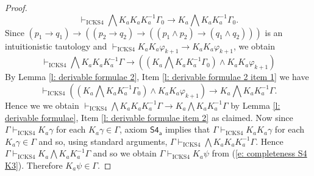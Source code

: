 \documentclass{myifcolog}
\newcommand{\K}{K}
\newcommand{\agi}{a}
\newcommand{\hicks}{\mathrm{ICKS4}}
\numberwithin{theorem}{section}
\begin{document}
\begin{proof}
\begin{equation}
       \vdash_\hicks \bigwedge \K_\agi \K_\agi \K_\agi^{-1}\Gamma_0 \rightarrow \K_\agi \bigwedge \K_\agi \K_\agi^{-1} \Gamma_0.
   \end{equation}
   Since $(p_1 \rightarrow q_1) \rightarrow ((p_2 \rightarrow q_2) \rightarrow ((p_1 \wedge p_2) \rightarrow (q_1 \wedge q_2)))$ is an intuitionistic tautology and $\vdash_\hicks \K_\agi \K_\agi \varphi_{k+1} \rightarrow \K_\agi \K_\agi \varphi_{k+1}$, we obtain
   \begin{equation}\label{e: completeness S4 K5}
       \vdash_\hicks \bigwedge \K_\agi \K_\agi \K_\agi^{-1}\Gamma \rightarrow ((\K_\agi \bigwedge \K_\agi \K_\agi^{-1} \Gamma_0) \wedge \K_\agi \K_\agi \varphi_{k+1})
   \end{equation}
 By Lemma \ref{l: derivable formulae 2}, Item \ref{l: derivable formulae 2 item 1} we have
 \begin{equation}\label{e: completeness S4 K6}
     \vdash_\hicks ((\K_\agi \bigwedge \K_\agi \K_\agi^{-1} \Gamma_0) \wedge \K_\agi \K_\agi \varphi_{k+1}) \rightarrow \K_\agi \bigwedge \K_\agi \K_\agi^{-1} \Gamma.
 \end{equation}
 Hence we we obtain $\vdash_\hicks \bigwedge \K_\agi \K_\agi \K_\agi^{-1} \Gamma \rightarrow \K_\agi \bigwedge \K_\agi \K_\agi^{-1} \Gamma$ by Lemma \ref{l: derivable formulae}, Item \ref{l: derivable formulae item 2}  as claimed. Now since $\Gamma \vdash_\hicks \K_\agi \gamma$ for each $\K_\agi \gamma \in \Gamma$, axiom $\mathsf{S4_\agi}$ implies that $\Gamma \vdash_\hicks \K_\agi \K_\agi \gamma$ for each $\K_\agi \gamma \in \Gamma$ and so, using standard arguments, $\Gamma \vdash_\hicks \bigwedge \K_\agi \K_\agi \K_\agi^{-1} \Gamma$. Hence $\Gamma \vdash_\hicks \K_\agi \bigwedge \K_\agi \K_\agi^{-1} \Gamma$ and so we obtain $\Gamma \vdash_\hicks \K_\agi \psi$ from (\ref{e: completeness S4 K3}). Therefore $\K_\agi \psi \in \Gamma$. \smallskip


\end{proof}
\end{document}
